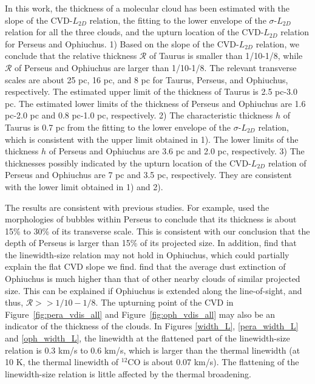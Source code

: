 \documentclass[iop,revtex4]{emulateapj}
\begin{document}
In this work, the thickness of a molecular cloud has been estimated with the slope of the CVD-$L_{2D}$ relation, the fitting to the lower envelope of the $\sigma$-$L_{2D}$ relation for all the three clouds, and the upturn location of the CVD-$L_{2D}$ relation for Perseus and Ophiuchus. 1) Based on the slope of the CVD-$L_{2D}$ relation, we conclude that the relative thickness $\mathcal{R}$ of Taurus is smaller than 1/10-1/8, while $\mathcal{R}$ of Perseus and Ophiuchus are larger than 1/10-1/8. The relevant transverse scales are about 25 pc, 16 pc, and 8 pc for Taurus, Perseus, and Ophiuchus, respectively. The estimated upper limit of the thickness of Taurus  is 2.5 pc-3.0 pc. The estimated lower limits of the thickness of Perseus and Ophiuchus are 1.6 pc-2.0 pc and 0.8 pc-1.0 pc, respectively. 2) The characteristic thickness $h$ of Taurus is 0.7 pc from the fitting to the lower envelope of the $\sigma$-$L_{2D}$ relation, which is consistent with the upper limit obtained in 1). The lower limits of the thickness $h$ of Perseus and Ophiuchus are 3.6 pc and 2.0 pc, respectively. 3) The thicknesses possibly indicated by the upturn location of the CVD-$L_{2D}$ relation of Perseus and Ophiuchus are 7 pc and 3.5 pc, respectively. They are consistent with the lower limit obtained in 1) and 2).


The results are consistent with previous studies. For example, \cite{Arce2011} used the morphologies of bubbles within Perseus to conclude that its thickness is about 15\% to 30\% of its transverse scale. This is consistent with our conclusion that the depth of Perseus is larger than 15\% of its projected size. In addition, \citep{Loren1989b} find that the linewidth-size relation may not hold in Ophiuchus, which could partially explain the flat CVD slope we find. \citet{observe_lognormal} find that the average dust extinction of Ophiuchus is much higher than that of other nearby clouds of similar projected size. This can be explained if Ophiuchus is extended along the line-of-sight, and thus, $\mathcal{R}>>1/10-1/8$. The upturning point of the CVD in Figure~\ref{fig:pera_vdis_all} and Figure~\ref{fig:oph_vdis_all} may also be an indicator of the thickness of the clouds. In Figures \ref{width_L}, \ref{pera_width_L} and \ref{oph_width_L}, the linewidth at the flattened part of the linewidth-size relation is 0.3 km/s to 0.6 km/s, which is larger than the thermal linewidth (at 10 K, the thermal linewidth of $^{12}$CO is about 0.07 km/s). The flattening of the linewidth-size relation is little affected by the thermal broadening.
\end{document}
